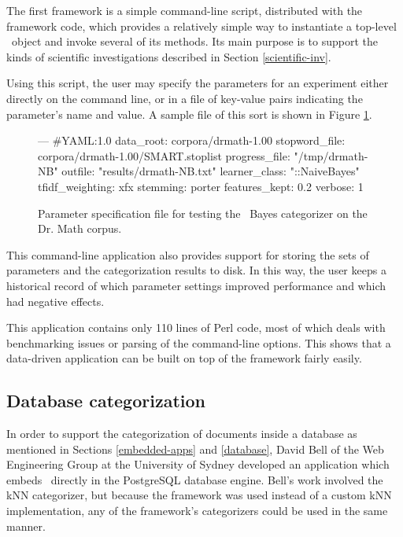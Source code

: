 The first framework is a simple command-line script, distributed with
the framework code, which provides a relatively simple way to
instantiate a top-level \aicat\ object and invoke several of its
methods.  Its main purpose is to support the kinds of scientific
investigations described in Section \ref{scientific-inv}.

Using this script, the user may specify the parameters for an
experiment either directly on the command line, or in a file of
key-value pairs indicating the parameter's name and value.  A sample
file of this sort is shown in Figure \ref{parameter-file}.

\begin{figure}
\begin{code}
--- #YAML:1.0
data_root: corpora/drmath-1.00
stopword_file: corpora/drmath-1.00/SMART.stoplist
progress_file: "/tmp/drmath-NB"
outfile: "results/drmath-NB.txt"
learner_class: "::NaiveBayes"
tfidf_weighting: xfx
stemming: porter
features_kept: 0.2
verbose: 1
\end{code}
\caption{Parameter specification file for testing the \naive\ Bayes
  categorizer on the Dr. Math corpus.}
\label{parameter-file}
\end{figure}

This command-line application also provides support for storing the
sets of parameters and the categorization results to disk.  In this
way, the user keeps a historical record of which parameter settings
improved performance and which had negative effects.

This application contains only 110 lines of Perl code, most of which
deals with benchmarking issues or parsing of the command-line
options.  This shows that a data-driven application can be built on
top of the framework fairly easily.

\subsection{Database categorization}

In order to support the categorization of documents inside a database
as mentioned in Sections \ref{embedded-apps} and \ref{database}, David
Bell of the Web Engineering Group at the University of Sydney
developed an application which embeds \aicat\ directly in the
PostgreSQL database engine.  Bell's work involved the kNN categorizer,
but because the framework was used instead of a custom kNN
implementation, any of the framework's categorizers could be used in
the same manner.

